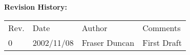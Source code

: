 


{\small
~\\
~\\
\noindent
{\bf Revision History:}\\
\begin{tabular}{llll}
Rev. & Date & Author & Comments\\

0             & 
2002/11/08    & 
Fraser Duncan &
\parbox[t]{3.0in}{
  First Draft
}
\end{tabular}
}






\newpage
\markright{\standardheader}



